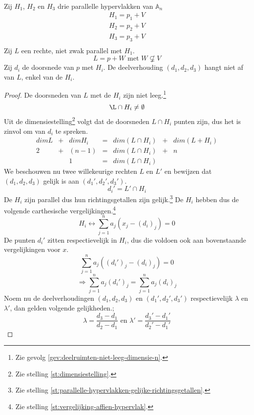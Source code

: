 \documentclass[main.tex]{subfiles}
\begin{document}
\begin{st}
  \label{st:stelling-van-thales}
  \\
  Zij $H_{1}$, $H_{2}$ en $H_{3}$ drie parallelle hypervlakken van $\mathbb{A}_{n}$
  \[
  \begin{array}{rl}
    H_{1} = p_{1} + V\\
    H_{2} = p_{2} + V\\
    H_{3} = p_{3} + V\\
  \end{array}
  \]
  Zij $L$ een rechte, niet zwak parallel met $H_{1}$.
  \[ L = p + W \text{ met } W \not\subsetneq V \]
  Zij $d_{i}$ de doorsnede van $p$ met $H_{i}$.
  De deelverhouding $(d_1,d_2,d_3)$ hangt niet af van $L$, enkel van de $H_{i}$.
 
  \begin{proof}
    De doorsneden van $L$ met de $H_{i}$ zijn niet leeg.\footnote{Zie gevolg \ref{gev:deelruimten-niet-leeg-dimensie-n}.}
    \[ \L \cap H_{i} \neq \emptyset \]
    Uit de dimensiestelling\footnote{Zie stelling \ref{st:dimensiestelling}.} volgt dat de doorsneden $L\cap H_{i}$ punten zijn, dus het is zinvol om van $d_{i}$ te spreken.
    \[
    \begin{array}{cccccccc}
    dim L &+& dim H_{i} &=& dim(L \cap H_{i}) &+& dim(L + H_{i})\\
    2     &+& (n-1)    &=& dim(L \cap H_{i}) &+& n\\
          & & 1        &=& dim(L \cap H_{i})
    \end{array}
    \] 
    We beschouwen nu twee willekeurige rechten $L$ en $L'$ en bewijzen dat $(d_1,d_2,d_3)$ gelijk is aan $(d_1',d_2',d_3')$.
    \[ d_{i}' = L' \cap H_{i} \]
    De $H_{i}$ zijn parallel dus hun richtingsgetallen zijn gelijk.\footnote{Zie stelling \ref{st:parallelle-hypervlakken-gelijke-richtingsgetallen}.}
    De $H_{i}$ hebben dus de volgende carthesische vergelijkingen.\footnote{Zie stelling \ref{st:vergelijking-affien-hypervlak}.}
    \[ H_{i} \leftrightarrow \sum_{j=1}^{n}a_{j}(x_{j}-(d_{i})_{j}) = 0 \]
    De punten $d_{i}'$ zitten respectievelijk in $H_{i}$, dus die voldoen ook aan bovenstaande vergelijkingen voor $x$.
    \[ \sum_{j=1}^{n}a_{j}((d_{i}')_{j}-(d_{i})_{j}) = 0 \]
    \[ \Rightarrow \sum_{j=1}^{n}a_{j}(d_{i}')_{j} = \sum_{j=1}^{n}a_{j}(d_{i})_{j}\]
    Noem nu de deelverhoudingen $(d_1,d_2,d_3)$ en $(d_1',d_2',d_3')$ respectievelijk $\lambda$ en $\lambda'$, dan gelden volgende gelijkheden.;
    \[ \lambda = \frac{d_{3}-d_{1}}{d_{2}-d_{1}} \text{ en } \lambda' = \frac{d_{3}'-d_{1}'}{d_{2}'-d_{1}'} \]

\end{proof}
\end{st}
\end{document}
